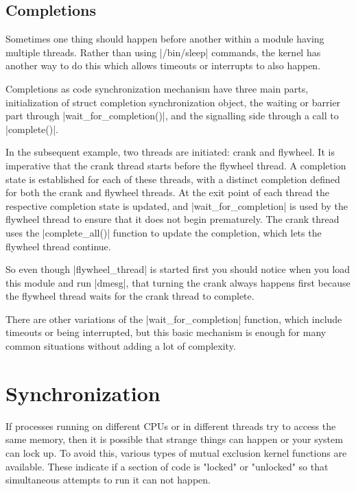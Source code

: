 \documentclass[10pt, oneside]{book}
\begin{document}


\subsection{Completions}
\label{sec:completion}
Sometimes one thing should happen before another within a module having multiple threads.
Rather than using \sh|/bin/sleep| commands, the kernel has another way to do this which allows timeouts or interrupts to also happen.

Completions as code synchronization mechanism have three main parts, initialization of struct completion synchronization object, the waiting or barrier part through \cpp|wait_for_completion()|, and the signalling side through a call to \cpp|complete()|.

In the subsequent example, two threads are initiated: crank and flywheel.
It is imperative that the crank thread starts before the flywheel thread.
A completion state is established for each of these threads, with a distinct completion defined for both the crank and flywheel threads.
At the exit point of each thread the respective completion state is updated, and \cpp|wait_for_completion| is used by the flywheel thread to ensure that it does not begin prematurely.
The crank thread uses the \cpp|complete_all()| function to update the completion, which lets the flywheel thread continue.

So even though \cpp|flywheel_thread| is started first you should notice when you load this module and run \sh|dmesg|, that turning the crank always happens first because the flywheel thread waits for the crank thread to complete.

There are other variations of the \cpp|wait_for_completion| function, which include timeouts or being interrupted, but this basic mechanism is enough for many common situations without adding a lot of complexity.


\section{Synchronization}
\label{sec:synchronization}
If processes running on different CPUs or in different threads try to access the same memory, then it is possible that strange things can happen or your system can lock up.
To avoid this, various types of mutual exclusion kernel functions are available.
These indicate if a section of code is "locked" or "unlocked" so that simultaneous attempts to run it can not happen.
\end{document}
